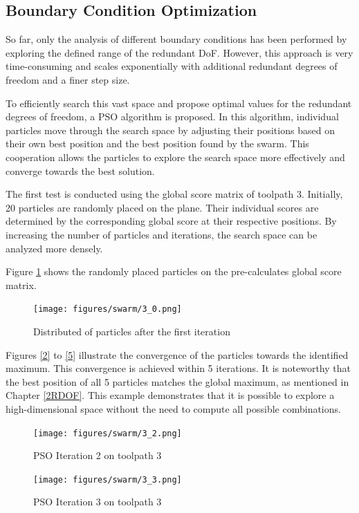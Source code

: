 \subsection{Boundary Condition Optimization }
So far, only the analysis of different boundary conditions has been performed by exploring the defined range of the redundant DoF. However, this approach is very time-consuming and scales exponentially with additional redundant degrees of freedom and a finer step size.

To efficiently search this vast space and propose optimal values for the redundant degrees of freedom, a \acrshort{PSO} algorithm is proposed. In this algorithm, individual particles move through the search space by adjusting their positions based on their own best position and the best position found by the swarm. This cooperation allows the particles to explore the search space more effectively and converge towards the best solution.

The first test is conducted using the global score matrix of toolpath 3. Initially, 20 particles are randomly placed on the plane. Their individual scores are determined by the corresponding global score at their respective positions. By increasing the number of particles and iterations, the search space can be analyzed more densely.

Figure \ref{PSO_1} shows the randomly placed particles on the pre-calculates global score matrix.

\begin{figure}[H]
	\centerline{\texttt{[image: figures/swarm/3\_0.png]}}
	\caption{Distributed of particles after the first iteration}
	\label{PSO_1}
\end{figure}


\newpage
Figures \ref{2} to \ref{5} illustrate the convergence of the particles towards the identified maximum. This convergence is achieved within 5 iterations. It is noteworthy that the best position of all 5 particles matches the global maximum, as mentioned in Chapter \ref{2RDOF}. This example demonstrates that it is possible to explore a high-dimensional space without the need to compute all possible combinations.


\begin{figure}[H]
	\centering
	\begin{minipage}{0.5\textwidth}
		\texttt{[image: figures/swarm/3\_2.png]}
		\caption{PSO Iteration 2 on toolpath 3}
		\label{2}
	\end{minipage}\hfill
	\begin{minipage}{0.5\textwidth}
		\texttt{[image: figures/swarm/3\_3.png]}
		\caption{PSO Iteration 3 on toolpath 3}
		\label{3}
	\end{minipage}\par
\end{figure}	


